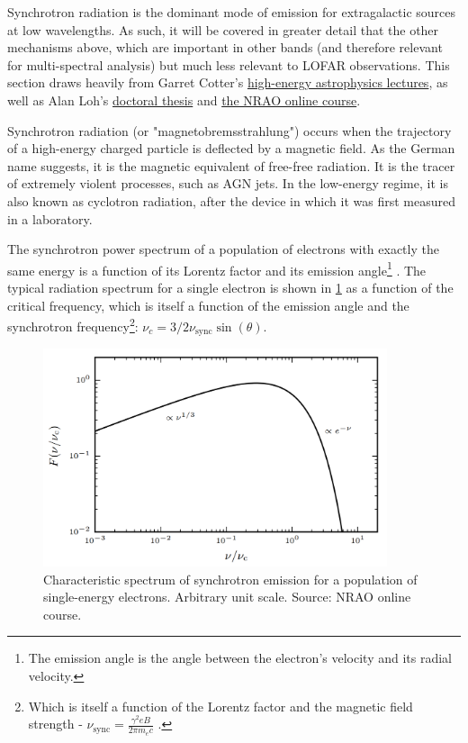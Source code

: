 \pg
Synchrotron radiation is the dominant mode of emission for extragalactic sources at low wavelengths. As such, it will be covered in greater detail that the other mechanisms above, which are important in other bands (and therefore relevant for multi-spectral analysis) but much less relevant to LOFAR observations. This section draws heavily from Garret Cotter's \href{http://www-astro.physics.ox.ac.uk/~garret/teaching/}{high-energy astrophysics lectures}, as well as Alan Loh's \href{http://theses.md.univ-paris-diderot.fr/LOH_Alan_2_va_20160930.pdf}{doctoral thesis} and \href{https://www.cv.nrao.edu/course/astr534/SelfAbsorption.html}{the NRAO online course}.

\pg
Synchrotron radiation (or "magnetobremsstrahlung") occurs when the trajectory of a high-energy charged particle is deflected by a magnetic field. As the German name suggests, it is the magnetic equivalent of free-free radiation. It is the tracer of extremely violent processes, such as AGN jets. In the low-energy regime, it is also known as cyclotron radiation, after the device in which it was first measured in a laboratory. %

\pg
The synchrotron power spectrum of a population of electrons with exactly the same energy is a function of its Lorentz factor and its emission angle\footnote{The emission angle is the angle between the electron's velocity and its radial velocity.} . The typical radiation spectrum for a single electron is shown in \cref{fig.synchrotron.1electrion} as a function of the critical frequency, which is itself a function of the emission angle and the synchrotron frequency\footnote{Which is itself a function of the Lorentz factor and the magnetic field strength - $\nu_\mathrm{sync}=\frac{\gamma^2 e B}{2\pi m_e c}$ .}: $\nu_c=3/2\nu_\mathrm{sync}\sin(\theta)$.
\begin{figure}[!h]
\centering
\includegraphics[width=0.9\textwidth]{images/Synchrotron-single-electron.png}
\caption{\label{fig.synchrotron.1electrion} Characteristic spectrum of synchrotron emission for a population of single-energy electrons. Arbitrary unit scale. Source: NRAO online course.}
\end{figure}


